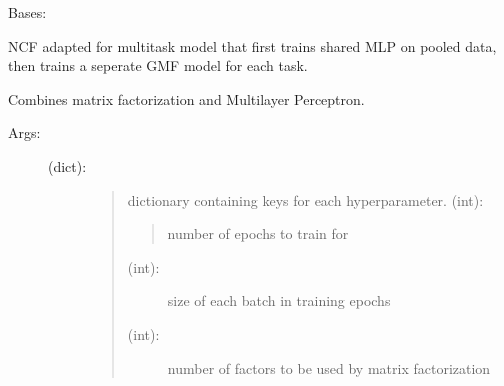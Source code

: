 \documentclass[letterpaper,10pt,english,openany,oneside]{sphinxmanual}
\begin{document}
\begin{fulllineitems}
\label{\detokenize{ncf:methods.mtl.NCF_MTL.Neural_Collaborative_Filtering_FeaturesMTLMLP}}
Bases: {\hyperref[\detokenize{base:methods.base.BaseMTLEstimator}]{}}

NCF adapted for multitask model that first trains shared MLP on pooled data, then trains a seperate GMF model for each task.

Combines matrix factorization and Multilayer Perceptron. 
\begin{description}
\item[{Args:}] \leavevmode\begin{description}
\item[{ (dict):}] \leavevmode\begin{quote}

dictionary containing keys for each hyperparameter.
 (int):
\begin{quote}

number of epochs to train for
\end{quote}
\begin{description}
\item[{ (int):}] \leavevmode
size of each batch in training epochs

\item[{ (int):}] \leavevmode
number of factors to be used by matrix factorization


\end{description}
\end{quote}
\end{description}
\end{description}
\end{fulllineitems}
\end{document}
